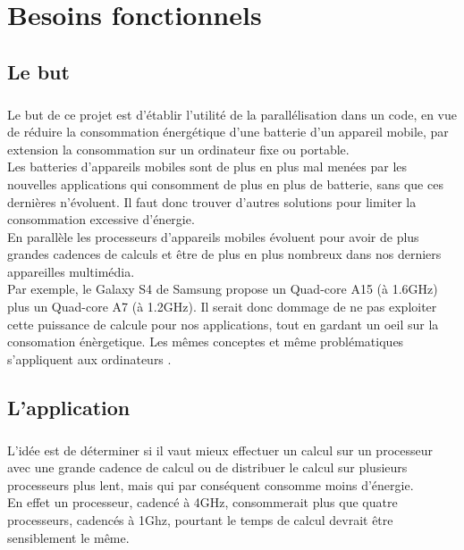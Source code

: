 \chapter{Besoins fonctionnels}

\section{Le but}
\paragraph{}
	Le but de ce projet est d'établir l'utilité de la parallélisation dans un code, en vue de réduire la consommation énergétique d'une batterie d'un appareil mobile, par extension la consommation sur un ordinateur fixe ou portable. \\

	Les batteries d'appareils mobiles sont de plus en plus mal menées par les nouvelles applications qui consomment de plus en plus de batterie, sans que ces dernières n'évoluent. Il faut donc trouver d'autres solutions pour limiter la consommation excessive d'énergie.\\

	En parallèle les processeurs d'appareils mobiles évoluent pour avoir de plus grandes cadences de calculs et être de plus en plus nombreux dans nos derniers appareilles multimédia.\\

	Par exemple, le Galaxy S4 de Samsung propose un Quad-core A15 (à 1.6GHz) plus un Quad-core A7 (à 1.2GHz). Il serait donc dommage de ne pas exploiter cette puissance de calcule pour nos applications, tout en gardant un oeil sur la consomation énèrgetique. Les mêmes conceptes et même problématiques s'appliquent aux ordinateurs .\\

\section{L'application}
\paragraph{}
	L'idée est de déterminer si il vaut mieux effectuer un calcul sur un processeur avec une grande cadence de calcul ou de distribuer le calcul sur plusieurs processeurs plus lent, mais qui par conséquent consomme moins d'énergie. \\

	En effet un processeur, cadencé à 4GHz, consommerait plus que quatre processeurs, cadencés à 1Ghz, pourtant le temps de calcul devrait être sensiblement le même.\\

